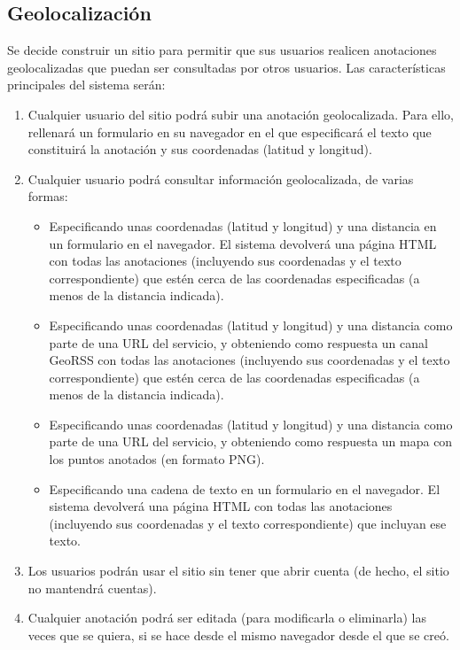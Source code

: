 \subsection{Geolocalización}

Se decide construir un sitio para permitir que sus usuarios realicen
anotaciones geolocalizadas que puedan ser consultadas por
otros usuarios. Las características principales del sistema serán:

\begin{enumerate}
\item Cualquier usuario del sitio podrá subir una anotación
  geolocalizada. Para ello, rellenará un formulario en su navegador en el que
  especificará el texto que constituirá la anotación y sus
  coordenadas (latitud y longitud).
\item Cualquier usuario podrá consultar información
  geolocalizada, de varias formas:
  \begin{itemize}
  \item Especificando unas coordenadas (latitud y longitud) y una
    distancia en un formulario en el navegador. El sistema devolverá
    una página HTML con todas las anotaciones (incluyendo sus
    coordenadas y el texto correspondiente) que estén cerca de las
    coordenadas especificadas (a menos de la distancia indicada).
  \item Especificando unas coordenadas (latitud y longitud) y una
    distancia como parte de una URL del servicio, y obteniendo como
    respuesta un canal GeoRSS con todas las anotaciones (incluyendo sus
    coordenadas y el texto correspondiente) que estén cerca de las
    coordenadas especificadas (a menos de la distancia indicada).
  \item Especificando unas coordenadas (latitud y longitud) y una
    distancia como parte de una URL del servicio, y obteniendo como
    respuesta un mapa con los puntos anotados (en formato PNG).
  \item Especificando una cadena de texto en un formulario en el
    navegador. El sistema devolverá una página HTML con todas las
    anotaciones (incluyendo sus coordenadas y el texto
    correspondiente) que incluyan ese texto.
  \end{itemize}
\item Los usuarios podrán usar el sitio sin tener que abrir cuenta (de
  hecho, el sitio no mantendrá cuentas).
\item Cualquier anotación podrá ser editada (para modificarla o
  eliminarla) las veces que se quiera, si se hace desde el mismo
  navegador desde el que se creó.
\end{enumerate}

